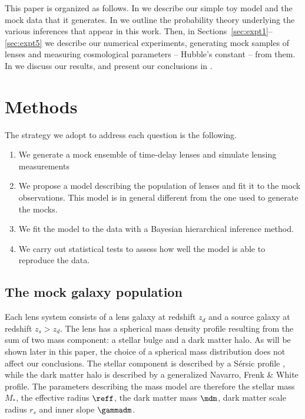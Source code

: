 \documentclass[useAMS,usenatbib]{mn2e}
\begin{document}
This paper is organized as follows. In  we describe our simple toy model and the mock data that it generates. In  we outline the probability theory underlying the various inferences that appear in this work. Then, in Sections~\ref{sec:expt1}--\ref{sec:expt5} we describe our numerical experiments, generating mock samples of lenses and measuring cosmological parameters -- Hubble's constant -- from them. In  we discuss our results, and present our conclusions in .



\section{Methods}\label{sec:hb}

The strategy we adopt to address each question is the following.
\begin{enumerate}
\item We generate a mock ensemble of time-delay lenses and simulate lensing measurements
\item We propose a model describing the population of lenses and fit it to the mock observations. This model is in general different from the one used to generate the mocks.
\item We fit the model to the data with a Bayesian hierarchical inference method.
\item We carry out statistical tests to assess how well the model is able to reproduce the data.
\end{enumerate}

\subsection{The mock galaxy population}\label{ssec:mock}
Each lens system consists of a lens galaxy at redshift $z_d$ and a source galaxy at redshift $z_s > z_d$.
The lens has a spherical mass density profile resulting from the sum of two mass component: a stellar bulge and a dark matter halo.
As will be shown later in this paper, the choice of a spherical mass distribution does not affect our conclusions.
The stellar component is described by a S\'{e}rsic profile \citep{Sersic1968}, while the dark matter halo is described by a generalized Navarro, Frenk \& White profile. 
The parameters describing the mass model are therefore the stellar mass $M_*$, the effective radius $\reff$, the dark matter mass $\mdm$, dark matter scale radius $r_s$ and inner slope $\gammadm$.
\end{document}
